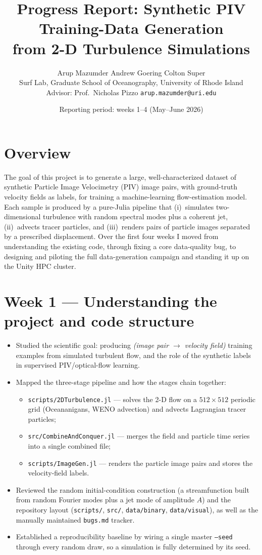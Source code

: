 \documentclass[11pt]{article}
\title{\textbf{Progress Report: Synthetic PIV Training-Data Generation\\
from 2-D Turbulence Simulations}}
\author{Arup Mazumder \quad Andrew Goering \quad Colton Super \\ \small Surf Lab, Graduate School of Oceanography, University of Rhode Island \\ \small Advisor: Prof.\ Nicholas Pizzo \quad\textbar\quad \texttt{arup.mazumder@uri.edu}}
\date{Reporting period: weeks 1--4 \quad (May--June 2026)}
\newcommand{\code}[1]{\texttt{\small #1}}
\begin{document}
\maketitle

\section*{Overview}
The goal of this project is to generate a large, well-characterized dataset of
synthetic Particle Image Velocimetry (PIV) image pairs, with ground-truth
velocity fields as labels, for training a machine-learning flow-estimation model.
Each sample is produced by a pure-Julia pipeline that (i)~simulates two-dimensional
turbulence with random spectral modes plus a coherent jet, (ii)~advects tracer
particles, and (iii)~renders pairs of particle images separated by a prescribed
displacement. Over the first four weeks I moved from understanding the existing
code, through fixing a core data-quality bug, to designing and piloting the
full data-generation campaign and standing it up on the Unity HPC cluster.

\section{Week 1 --- Understanding the project and code structure}
\begin{itemize}
  \item Studied the scientific goal: producing \emph{(image pair $\rightarrow$
        velocity field)} training examples from simulated turbulent flow, and the
        role of the synthetic labels in supervised PIV/optical-flow learning.
  \item Mapped the three-stage pipeline and how the stages chain together:
        \begin{itemize}
          \item \code{scripts/2DTurbulence.jl} --- solves the 2-D flow on a
                $512\times512$ periodic grid (Oceananigans, WENO advection) and
                advects Lagrangian tracer particles;
          \item \code{src/CombineAndConquer.jl} --- merges the field and particle
                time series into a single combined file;
          \item \code{scripts/ImageGen.jl} --- renders the particle image pairs
                and stores the velocity-field labels.
        \end{itemize}
  \item Reviewed the random initial-condition construction (a streamfunction built
        from random Fourier modes plus a jet mode of amplitude $A$) and the
        repository layout (\code{scripts/}, \code{src/}, \code{data/binary},
        \code{data/visual}), as well as the manually maintained \code{bugs.md}
        tracker.
  \item Established a reproducibility baseline by wiring a single master
        \code{--seed} through every random draw, so a simulation is fully
        determined by its seed.
\end{itemize}
\end{document}
